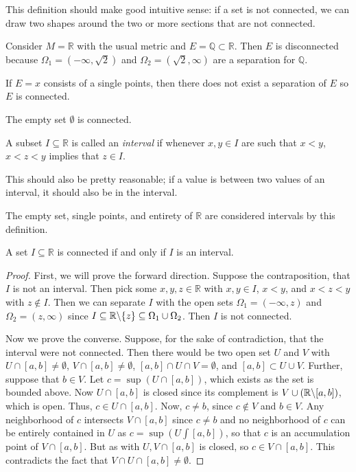 \documentclass[11pt]{article}
\theoremstyle{definition}
\newcommand{\R}{\mathbb{R}}                      %
\newcommand{\Q}{\mathbb{Q}}
\newcommand{\bslash}{\symbol{92}}
\begin{document}
This definition should make good intuitive sense: if a set is not connected, we can draw two shapes around the two or more sections that are not connected.

\ex Consider $M=\R$ with the usual metric and $E=\Q\subset \R$. Then $E$ is disconnected because $\Omega_1=(-\infty,\sqrt2)$ and $\Omega_2=(\sqrt2,\infty)$ are a separation for $\Q$.

\ex If $E={x}$ consists of a single points, then there does not exist a separation of $E$ so $E$ is connected.

\ex The empty set $\emptyset$ is connected.

\begin{mdframed}[backgroundcolor = blue!10]
\vspace{+0.2cm}
     A subset $I\subseteq \R$ is called an \textit{interval} if whenever $x,y\in I$ are such that $x<y$, $x<z<y$ implies that $z\in I$.
\end{mdframed}

This should also be pretty reasonable; if a value is between two values of an interval, it should also be in the interval.

\note The empty set, single points, and entirety of $\R$ are considered intervals by this definition.

\prop A set $I\subseteq\R$ is connected if and only if $I$ is an interval.

\begin{proof}
    First, we will prove the forward direction. Suppose the contraposition, that $I$ is not an interval. Then pick some $x,y,z\in \R$ with $x,y\in I$, $x<y$, and $x<z<y$ with $z\not\in I$. Then we can separate $I$ with the open sets $\Omega_1=(-\infty, z)$ and $\Omega_2=(z,\infty)$ since $I\subseteq\R\bslash\{z\}\subseteq\Omega_1\cup\Omega_2$. Then $I$ is not connected.

    Now we prove the converse. Suppose, for the sake of contradiction, that the interval were not connected. Then there would be two open set $U$ and $V$ with $U\cap [a,b]\neq \emptyset$, $V\cap [a,b]\neq\emptyset$, $[a,b]\cap U\cap V = \emptyset$, and $[a,b]\subset U\cup V$. Further, suppose that $b\in V$. Let $c=\sup(U\cap [a,b])$, which exists as the set is bounded above. Now $U\cap [a,b]$ is closed since its complement is $V\cup (\R\symbol{92}[a,b])$, which is open. Thus, $c\in U\cap [a,b]$. Now, $c\neq b$, since $c\not\in V$ and $b\in V$. Any neighborhood of $c$ intersects $V\cap [a,b]$ since $c\neq b$ and no neighborhood of $c$ can be entirely contained in $U$ as $c=\sup(U\int [a,b])$, so that $c$ is an accumulation point of $V\cap[a,b]$. But as with $U,V\cap[a,b]$ is closed, so $c\in V\cap [a,b]$. This contradicts the fact that $V\cap U\cap [a,b]\neq \emptyset$.
\end{proof}
\end{document}
